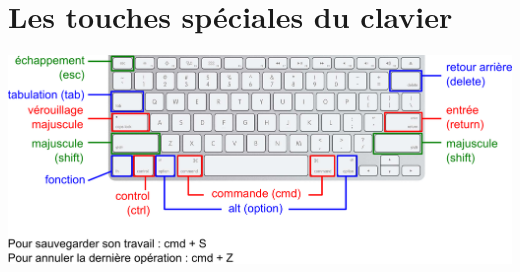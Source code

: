 \section*{Les touches spéciales du clavier}

\vfill

\begin{center}
\includegraphics[angle=90,width=.6\textwidth]{./images/generales/clavierTouches}
\end{center}

\vfill
